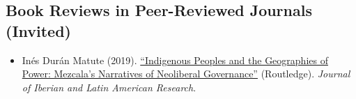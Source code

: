 \begin{itemize}

\end{itemize}




\subsection*{Book Reviews in Peer-Reviewed Journals (Invited)}

\begin{itemize}
	\item[\textcolor{gray}{\textbullet}] In\'es Dur\'an Matute (2019). \href{https://doi.org/10.1080/13260219.2019.1671679}{``Indigenous Peoples and the Geographies of Power: Mezcala's Narratives of Neoliberal Governance''} (Routledge). \emph{Journal of Iberian and Latin American Research}. %
\end{itemize}





